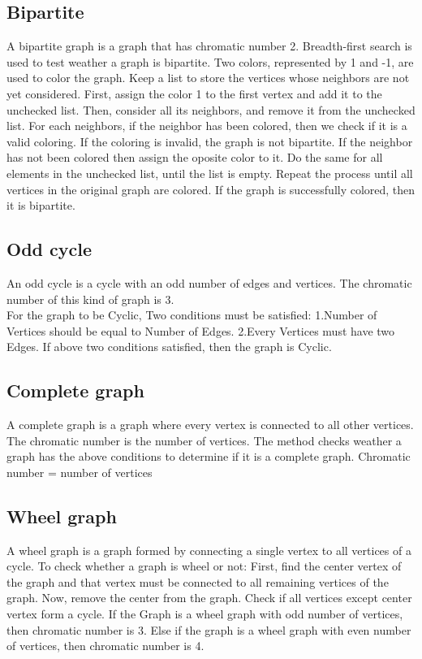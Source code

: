 \documentclass[a4paper]{report}
\begin{document}
			\subsection{Bipartite}
			A bipartite graph is a graph that has chromatic number 2. Breadth-first search is used to test weather a graph is bipartite. Two colors, represented by 1 and -1, are used to color the graph. Keep a list to store the vertices whose neighbors are not yet considered. First, assign the color 1 to the first vertex and add it to the unchecked list. Then, consider all its neighbors, and remove it from the unchecked list. For each neighbors, if the neighbor has been colored, then we check if it is a valid coloring. If the coloring is invalid, the graph is not bipartite. If the neighbor has not been colored then assign the oposite color to it. Do the same for all elements in the unchecked list, until the list is empty. Repeat the process until all vertices in the original graph are colored. If the graph is successfully colored, then it is bipartite.
			\subsection{Odd cycle}
			An odd cycle is a cycle with an odd number of edges and vertices. The chromatic number of this kind of graph is 3. \\
			For the graph to be Cyclic, Two conditions must be satisfied:
			1.Number of Vertices should be equal to Number of Edges.
			2.Every Vertices must have two Edges.
			If above two conditions satisfied, then  the graph is Cyclic.
			
			\subsection{Complete graph}
			A complete graph is a graph where every vertex is connected to all other vertices. The chromatic number is the number of vertices. The method checks weather a graph has the above conditions to determine if it is a complete graph.
			Chromatic number = number of vertices
			\subsection{Wheel graph}
			A wheel graph is a graph formed by connecting a single vertex to all vertices of a cycle.
			To check whether a graph is wheel or not: First, find the center vertex of the graph and that vertex must be connected to all remaining vertices of the graph. Now, remove the  center from the graph. Check if all vertices except center vertex form a cycle.
			If the Graph is a wheel graph with odd number of vertices, then chromatic number is 3.
			Else if the graph is a wheel graph with even number of vertices, then chromatic number is 4.
			
\end{document}
